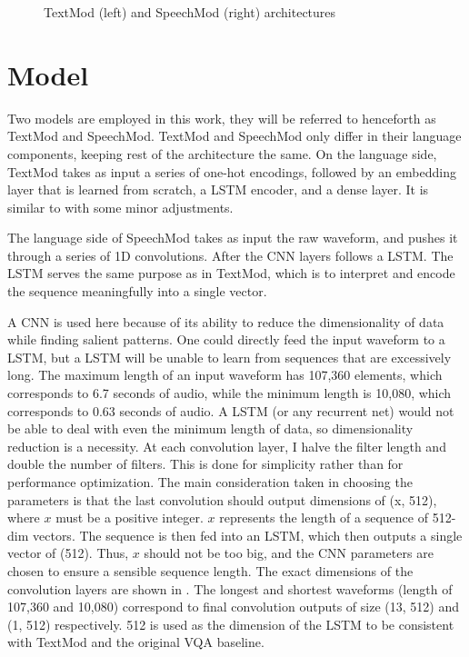 \documentclass[letterpaper]{article} %
\begin{document}
\begin{figure}[t]
\caption{TextMod (left) and SpeechMod (right) architectures}
\label{fig:modarc}
\end{figure}

\section{Model}
\label{sec:method}
Two models are employed in this work, they will be referred to henceforth as TextMod and SpeechMod. TextMod and SpeechMod only differ in their language components, keeping rest of the architecture the same. On the language side, TextMod takes as input a series of one-hot encodings, followed by an embedding layer that is learned from scratch, a LSTM encoder, and a dense layer. It is similar to \cite{VQA} with some minor adjustments.

The language side of SpeechMod takes as input the raw waveform, and pushes it through a series of 1D convolutions. After the CNN layers follows a LSTM. The LSTM serves the same purpose as in TextMod, which is to interpret and encode the sequence meaningfully into a single vector.

A CNN is used here because of its ability to reduce the dimensionality of data while finding salient patterns. One could directly feed the input waveform to a LSTM, but a LSTM will be unable to learn from sequences that are excessively long. The maximum length of an input waveform has 107,360 elements, which corresponds to 6.7 seconds of audio, while the minimum length is 10,080, which corresponds to 0.63 seconds of audio. A LSTM (or any recurrent net) would not be able to deal with even the minimum length of data, so dimensionality reduction is a necessity. At each convolution layer, I halve the filter length and double the number of filters. This is done for simplicity rather than for performance optimization. The main consideration taken in choosing the parameters is that the last convolution should output dimensions of (x, 512), where $x$ must be a positive integer. $x$ represents the length of a sequence of 512-dim vectors. The sequence is then fed into an LSTM, which then outputs a single vector of (512). Thus, $x$ should not be too big, and the CNN parameters are chosen to ensure a sensible sequence length. The exact dimensions of the convolution layers are shown in . The longest and shortest waveforms (length of 107,360 and 10,080) correspond to final convolution outputs of size (13, 512) and (1, 512) respectively. 512 is used as the dimension of the LSTM to be consistent with TextMod and the original VQA baseline.
\end{document}
